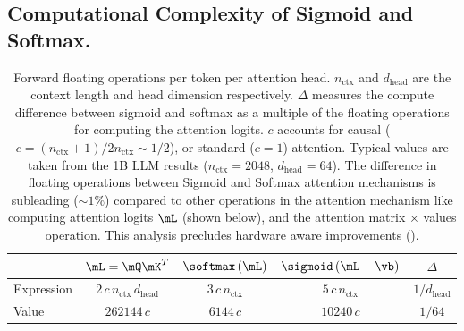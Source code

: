 \subsection{Computational Complexity of Sigmoid and Softmax.}
\label{sec:parameter_and_flops}
\vspace{-0.1in}
\begin{table}[h!]
\small
\centering
\caption{Forward floating operations per token per attention head. 
$n_\text{ctx}$ and $d_\text{head}$ are the context length and head dimension respectively. 
$\Delta$ measures the compute difference between sigmoid and softmax as a multiple of the floating operations for computing the attention logits. 
$c$ accounts for causal ($c=(n_\text{ctx}+1)/2n_\text{ctx}\sim1/2$), or standard ($c=1$) attention.
Typical values are taken from the 1B LLM results ($n_\text{ctx}=2048$, $d_\text{head}=64$).
The difference in floating operations between Sigmoid and Softmax attention mechanisms is subleading ($\sim1\%$) compared to other operations in the attention mechanism like computing attention logits $\mL$ (shown below), and the attention matrix $\times$ values operation. This analysis precludes hardware aware improvements ().
}
\label{tab:flop-counts}
\begin{tabular}{lcccc}
\toprule
& $\mL=\mQ\mK^T$ & $\softmax\left(\mL\right)$ & $\sigmoid\left(\mL+\vb\right)$ & $\Delta$ \\ \midrule 
Expression & $ 2\,c\,n_\text{ctx}\,d_{\text{head}}$ & $ 3\,c\,n_\text{ctx}$ & $ 5\,c\,n_\text{ctx}$ & $1/d_{\text{head}}$\\
Value & $262144\,c$ & $6144\,c$ & $10240\,c$ & $1/64$ \\ \bottomrule
\end{tabular}
\end{table}



